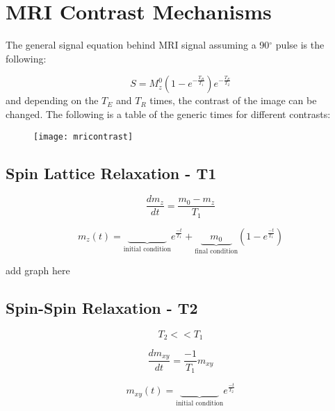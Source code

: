 \section{MRI Contrast Mechanisms}

The general signal equation behind MRI signal assuming a 90$^\circ$ pulse is the following:

\begin{equation}
S = M_z^0(1-e^{-\frac{T_R}{T_1}})e^{-\frac{T_E}{T_2}}
\end{equation}
and depending on the $T_E$ and $T_R$ times, the contrast of the image can be changed. The following is a table of the generic times for different contrasts:

\begin{figure}[h]
	\begin{center}
		\texttt{[image: mricontrast]}	
	\end{center}
\end{figure}

\subsection{Spin Lattice Relaxation - T1}
\begin{equation}
\frac{dm_z}{dt}= \frac{m_0-m_z}{T_1}
\end{equation}

\begin{equation}
m_z(t) = \underset{\text{initial condition}}{\underbrace{\qquad\qquad}} e^{\frac{-t}{T_1}} + \underset{\text{final condition}}{\underbrace{\quad m_0\quad}}\left(1-e^{\frac{-t}{T_1}}\right)
\end{equation}

add graph here


\subsection{Spin-Spin Relaxation - T2}
\begin{equation}
T_2 << T_1
\end{equation}

\begin{equation}
\frac{dm_{xy}}{dt}= \frac{-1}{T_1}m_{xy}
\end{equation}

\begin{equation}
m_{xy}(t) = \underset{\text{initial condition}}{\underbrace{\qquad\qquad}} e^{\frac{-t}{T_2}}
\end{equation}

